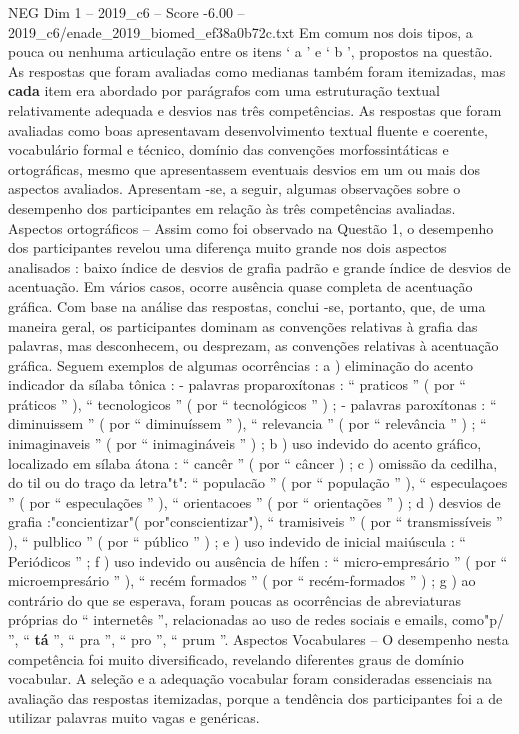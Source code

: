 \begin{textsample}{NEG Dim 1 – 2019\_c6 – Score -6.00 – 2019\_c6/enade\_2019\_biomed\_ef38a0b72c.txt}
Em comum nos dois tipos, a pouca ou nenhuma articulação entre os itens ‘ a ’ e ‘ b ’, propostos na questão.
As respostas que foram avaliadas como medianas também foram itemizadas, mas \textbf{cada} item era abordado por parágrafos com uma estruturação textual relativamente adequada e desvios nas três competências.
As respostas que foram avaliadas como boas apresentavam desenvolvimento textual fluente e coerente, vocabulário formal e técnico, domínio das convenções morfossintáticas e ortográficas, mesmo que apresentassem eventuais desvios em um ou mais dos aspectos avaliados.
Apresentam -se, a seguir, algumas observações sobre o desempenho dos participantes em relação às três competências avaliadas.
Aspectos ortográficos – Assim como foi observado na Questão 1, o desempenho dos participantes revelou uma diferença muito grande nos dois aspectos analisados : baixo índice de desvios de grafia padrão e grande índice de desvios de acentuação.
Em vários casos, ocorre ausência quase completa de acentuação gráfica.
Com base na análise das respostas, conclui -se, portanto, que, de uma maneira geral, os participantes dominam as convenções relativas à grafia das palavras, mas desconhecem, ou desprezam, as convenções relativas à acentuação gráfica.
Seguem exemplos de algumas ocorrências : a ) eliminação do acento indicador da sílaba tônica : - palavras proparoxítonas : “ praticos ” ( por “ práticos ” ), “ tecnologicos ” ( por “ tecnológicos ” ) ; - palavras paroxítonas : “ diminuissem ” ( por “ diminuíssem ” ), “ relevancia ” ( por “ relevância ” ) ; “ inimaginaveis ” ( por “ inimagináveis ” ) ; b ) uso indevido do acento gráfico, localizado em sílaba átona : “ cancêr ” ( por “ câncer ) ; c ) omissão da cedilha, do til ou do traço da letra"t": “ populacão ” ( por “ população ” ), “ especulaçoes ” ( por “ especulações ” ), “ orientacoes ” ( por “ orientações ” ) ; d ) desvios de grafia :"concientizar"( por"conscientizar"), “ tramisiveis ” ( por “ transmissíveis ” ), “ pulblico ” ( por “ público ” ) ; e ) uso indevido de inicial maiúscula : “ Periódicos ” ; f ) uso indevido ou ausência de hífen : “ micro-empresário ” ( por “ microempresário ” ), “ recém formados ” ( por “ recém-formados ” ) ; g ) ao contrário do que se esperava, foram poucas as ocorrências de abreviaturas próprias do “ internetês ”, relacionadas ao uso de redes sociais e emails, como"p/ ”, “ \textbf{tá} ”, “ pra ”, “ pro ”, “ prum ”.
Aspectos Vocabulares – O desempenho nesta competência foi muito diversificado, revelando diferentes graus de domínio vocabular.
A seleção e a adequação vocabular foram consideradas essenciais na avaliação das respostas itemizadas, porque a tendência dos participantes foi a de utilizar palavras muito vagas e genéricas.

\end{textsample}
